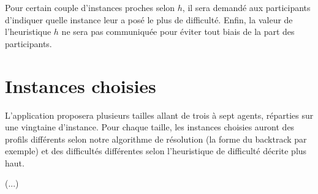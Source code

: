 \documentclass[a4paper, 10pt]{article}
\begin{document}
	Pour certain couple d'instances proches selon $h$, il sera demandé aux participants d'indiquer quelle instance leur a posé le plus de difficulté. Enfin, la valeur de l'heuristique $h$ ne sera pas communiquée pour éviter tout biais de la part des participants. 
	
	\section*{Instances choisies}
	
	L'application proposera plusieurs tailles allant de trois à sept agents, réparties sur une vingtaine d'instance. Pour chaque taille, les instances choisies auront des profils différents selon notre algorithme de résolution (la forme du backtrack par exemple) et des difficultés différentes selon l'heuristique de difficulté décrite plus haut.
	
	(...)
	
\end{document}

